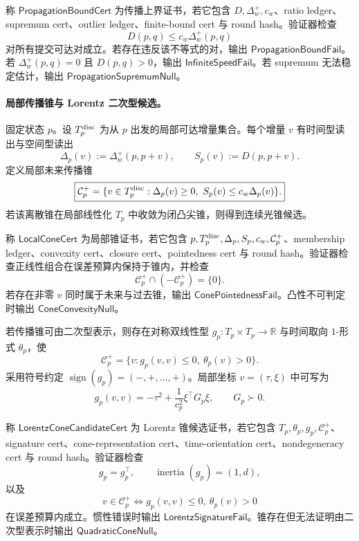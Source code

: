 \begin{definition}[传播上界证书]\label{def:typed-address-biaxial-completion-propagation-bound-cert}
称 \(\mathsf{PropagationBoundCert}\) 为传播上界证书，若它包含 \(D,\Delta_w^+,c_w\)、ratio ledger、supremum cert、outlier ledger、finite-bound cert 与 round hash。验证器检查
\[
D(p,q)\le c_w\Delta_w^+(p,q)
\]
对所有提交可达对成立。若存在违反该不等式的对，输出 \(\mathsf{PropagationBoundFail}\)。若 \(\Delta_w^+(p,q)=0\) 且 \(D(p,q)>0\)，输出 \(\mathsf{InfiniteSpeedFail}\)。若 supremum 无法稳定估计，输出 \(\mathsf{PropagationSupremumNull}\)。
\end{definition}

\paragraph{局部传播锥与 Lorentz 二次型候选。}
固定状态 \(p\)。设 \(T_p^{\rm disc}\) 为从 \(p\) 出发的局部可达增量集合。每个增量 \(v\) 有时间型读出与空间型读出
\[
\Delta_p(v):=\Delta_w^+(p,p+v),
\qquad
S_p(v):=D(p,p+v).
\]
定义局部未来传播锥
\[
\boxed{
\mathcal C_p^+
=
\{v\in T_p^{\rm disc}:
\Delta_p(v)\ge0,\ S_p(v)\le c_w\Delta_p(v)\}.
}
\]
若该离散锥在局部线性化 \(T_p\) 中收敛为闭凸尖锥，则得到连续光锥候选。

\begin{definition}[局部锥证书]\label{def:typed-address-biaxial-completion-local-cone-cert}
称 \(\mathsf{LocalConeCert}\) 为局部锥证书，若它包含 \(p,T_p^{\rm disc},\Delta_p,S_p,c_w,\mathcal C_p^+\)、membership ledger、convexity cert、closure cert、pointedness cert 与 round hash。验证器检查正线性组合在误差预算内保持于锥内，并检查
\[
\mathcal C_p^+\cap(-\mathcal C_p^+)=\{0\}.
\]
若存在非零 \(v\) 同时属于未来与过去锥，输出 \(\mathsf{ConePointednessFail}\)。凸性不可判定时输出 \(\mathsf{ConeConvexityNull}\)。
\end{definition}

若传播锥可由二次型表示，则存在对称双线性型 \(g_p:T_p\times T_p\to\mathbb R\) 与时间取向 \(1\)-形式 \(\theta_p\)，使
\[
\boxed{
\mathcal C_p^+
=
\{v:g_p(v,v)\le0,\ \theta_p(v)>0\}.
}
\]
采用符号约定 \(\operatorname{sign}(g_p)=(-,+,\ldots,+)\)。局部坐标 \(v=(\tau,\xi)\) 中可写为
\[
\boxed{
g_p(v,v)=
-\tau^2+\frac{1}{c_p^2}\xi^\top G_p\xi,
\qquad
G_p\succ0.
}
\]

\begin{definition}\label{def:typed-address-biaxial-completion-lorentz-cone-candidate-cert}
称 \(\mathsf{LorentzConeCandidateCert}\) 为 Lorentz 锥候选证书，若它包含 \(T_p,\theta_p,g_p,\mathcal C_p^+\)、signature cert、cone-representation cert、time-orientation cert、nondegeneracy cert 与 round hash。验证器检查
\[
g_p=g_p^\top,
\qquad
\operatorname{inertia}(g_p)=(1,d),
\]
以及
\[
v\in\mathcal C_p^+
\Longleftrightarrow
g_p(v,v)\le0,\ \theta_p(v)>0
\]
在误差预算内成立。惯性错误时输出 \(\mathsf{LorentzSignatureFail}\)。锥存在但无法证明由二次型表示时输出 \(\mathsf{QuadraticConeNull}\)。
\end{definition}

